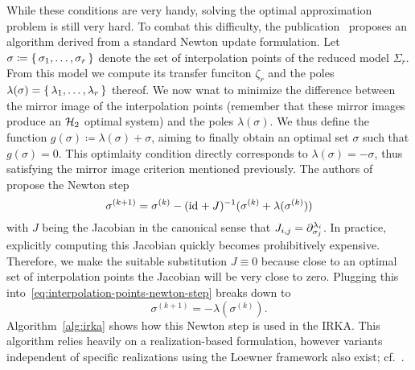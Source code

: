 While these conditions are very handy, solving the optimal approximation problem is still very hard.
To combat this difficulty, the publication~\cite{Gugercin2008} proposes an algorithm derived from a standard Newton update formulation.
Let $\sigma \coloneqq \sset{\sigma_1, \dots, \sigma_r}$ denote the set of interpolation points of the reduced model $\Sigma_r$.
From this model we compute its transfer funciton $\zeta_r$ and the poles $\lambda(\sigma) = \sset{\lambda_1, \dots, \lambda_r}$ thereof.
We now wnat to minimize the difference between the mirror image of the interpolation points (remember that these mirror images produce an $\mcl{H}_2$ optimal system) and the poles $\lambda(\sigma)$.
We thus define the function $g(\sigma) \coloneqq \lambda(\sigma) + \sigma$, aiming to finally obtain an optimal set $\sigma$ such that $g(\sigma) = 0$.
This optimlaity condition directly corresponds to $\lambda(\sigma) = -\sigma$, thus satisfying the mirror image criterion mentioned previously.
The authors of~\cite{Gugercin2008} propose the Newton step
\begin{equation}\label{eq:interpolation-points-newton-step}
    \sigma^{(k + 1)} = \sigma^{(k)} - (\id + J)\inv (\sigma^{(k)} + \lambda(\sigma^{(k)}))
\end{equation}
with $J$ being the Jacobian in the canonical sense that $J_{i, j} = \pd[\sigma_j]{\lambda_i}$.
In practice, explicitly computing this Jacobian quickly becomes prohibitively expensive.
Therefore, we make the suitable substitution $J \equiv 0$ because close to an optimal set of interpolation points the Jacobian will be very close to zero.
Plugging this into~\eqref{eq:interpolation-points-newton-step} breaks down to
\begin{equation*}
    \sigma^{(k + 1)} = - \lambda(\sigma^{(k)}).
\end{equation*}
Algorithm~\ref{alg:irka} shows how this Newton step is used in the \ac{IRKA}.
This algorithm relies heavily on a realization-based formulation, however variants independent of specific realizations using the Loewner framework also exist; cf.~\cite[Algorithm~7.2]{Beattie2017}.

